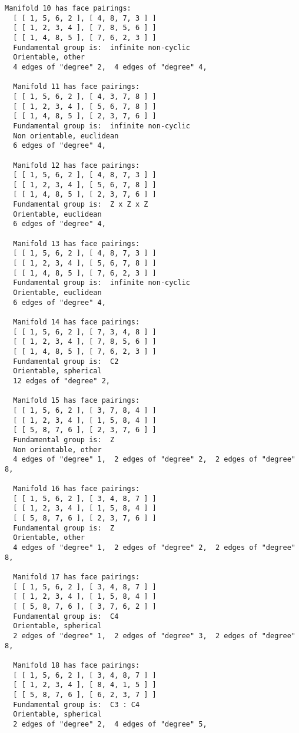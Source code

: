 \documentclass[a4paper,11pt]{report}
\begin{document}
{{{\begin{Verbatim}[commandchars=@|A,fontsize=\small,frame=single,label=Example]
  Manifold 10 has face pairings:
  [ [ 1, 5, 6, 2 ], [ 4, 8, 7, 3 ] ]
  [ [ 1, 2, 3, 4 ], [ 7, 8, 5, 6 ] ]
  [ [ 1, 4, 8, 5 ], [ 7, 6, 2, 3 ] ]
  Fundamental group is:  infinite non-cyclic
  Orientable, other
  4 edges of "degree" 2,  4 edges of "degree" 4,  
  
  Manifold 11 has face pairings:
  [ [ 1, 5, 6, 2 ], [ 4, 3, 7, 8 ] ]
  [ [ 1, 2, 3, 4 ], [ 5, 6, 7, 8 ] ]
  [ [ 1, 4, 8, 5 ], [ 2, 3, 7, 6 ] ]
  Fundamental group is:  infinite non-cyclic
  Non orientable, euclidean
  6 edges of "degree" 4,  
  
  Manifold 12 has face pairings:
  [ [ 1, 5, 6, 2 ], [ 4, 8, 7, 3 ] ]
  [ [ 1, 2, 3, 4 ], [ 5, 6, 7, 8 ] ]
  [ [ 1, 4, 8, 5 ], [ 2, 3, 7, 6 ] ]
  Fundamental group is:  Z x Z x Z
  Orientable, euclidean
  6 edges of "degree" 4,  
  
  Manifold 13 has face pairings:
  [ [ 1, 5, 6, 2 ], [ 4, 8, 7, 3 ] ]
  [ [ 1, 2, 3, 4 ], [ 5, 6, 7, 8 ] ]
  [ [ 1, 4, 8, 5 ], [ 7, 6, 2, 3 ] ]
  Fundamental group is:  infinite non-cyclic
  Orientable, euclidean
  6 edges of "degree" 4,  
  
  Manifold 14 has face pairings:
  [ [ 1, 5, 6, 2 ], [ 7, 3, 4, 8 ] ]
  [ [ 1, 2, 3, 4 ], [ 7, 8, 5, 6 ] ]
  [ [ 1, 4, 8, 5 ], [ 7, 6, 2, 3 ] ]
  Fundamental group is:  C2
  Orientable, spherical
  12 edges of "degree" 2,  
  
  Manifold 15 has face pairings:
  [ [ 1, 5, 6, 2 ], [ 3, 7, 8, 4 ] ]
  [ [ 1, 2, 3, 4 ], [ 1, 5, 8, 4 ] ]
  [ [ 5, 8, 7, 6 ], [ 2, 3, 7, 6 ] ]
  Fundamental group is:  Z
  Non orientable, other
  4 edges of "degree" 1,  2 edges of "degree" 2,  2 edges of "degree" 8,  
  
  Manifold 16 has face pairings:
  [ [ 1, 5, 6, 2 ], [ 3, 4, 8, 7 ] ]
  [ [ 1, 2, 3, 4 ], [ 1, 5, 8, 4 ] ]
  [ [ 5, 8, 7, 6 ], [ 2, 3, 7, 6 ] ]
  Fundamental group is:  Z
  Orientable, other
  4 edges of "degree" 1,  2 edges of "degree" 2,  2 edges of "degree" 8,  
  
  Manifold 17 has face pairings:
  [ [ 1, 5, 6, 2 ], [ 3, 4, 8, 7 ] ]
  [ [ 1, 2, 3, 4 ], [ 1, 5, 8, 4 ] ]
  [ [ 5, 8, 7, 6 ], [ 3, 7, 6, 2 ] ]
  Fundamental group is:  C4
  Orientable, spherical
  2 edges of "degree" 1,  2 edges of "degree" 3,  2 edges of "degree" 8,  
  
  Manifold 18 has face pairings:
  [ [ 1, 5, 6, 2 ], [ 3, 4, 8, 7 ] ]
  [ [ 1, 2, 3, 4 ], [ 8, 4, 1, 5 ] ]
  [ [ 5, 8, 7, 6 ], [ 6, 2, 3, 7 ] ]
  Fundamental group is:  C3 : C4
  Orientable, spherical
  2 edges of "degree" 2,  4 edges of "degree" 5,  
  

\end{Verbatim}}}}
\end{document}
